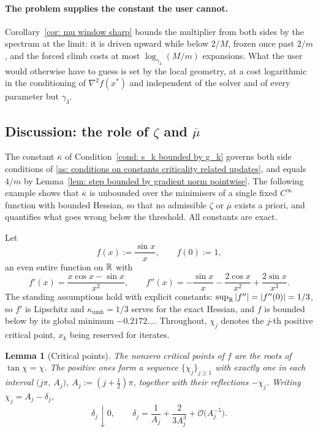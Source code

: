 \documentclass[11pt]{article}
\theoremstyle{plain}
\newtheorem{lemma}[theorem]{Lemma}
\theoremstyle{definition}
\theoremstyle{remark}
\numberwithin{equation}{section}
\providecommand{\defeq}{\mathrel{:=}}
\newcommand*\mykappa[1]{\kappa_{\scriptscriptstyle\text{#1}}}
\providecommand{\gthree}{\gamma_3}
\providecommand{\kbar}{\overline{\kappa}}
\providecommand{\kbar}{\overline{\kappa}}
\providecommand{\calO}{\mathcal{O}}
\begin{document}
\paragraph{The problem supplies the constant the user cannot.}
Corollary~\ref{cor: mu window sharp} bounds the multiplier from both sides by the spectrum at the
limit: it is driven upward while below $2/M$, frozen once past $2/m$, and the forced climb costs
at most $\log_{\gthree}(M/m)$ expansions. What the user would otherwise have to guess is set by
the local geometry, at a cost logarithmic in the conditioning of $\nabla^2 f(x^*)$ and independent
of the solver and of every parameter but $\gthree$.

\subsection{Discussion: the role of \texorpdfstring{$\zeta$}{zeta} and
            \texorpdfstring{$\overline{\mu}$}{mu-bar}}
\label{subsec:discussion on the convergence rate}

The constant $\kbar$ of Condition~\ref{cond: s_k bounded by g_k} governs both side conditions of
\ref{as: conditions on constants criticality related updates}, and equals $4/m$ by
Lemma~\ref{lem: step bounded by gradient norm pointwise}. The following example shows that $\kbar$
is unbounded over the minimisers of a single fixed $C^\infty$ function with bounded Hessian, so
that no admissible $\zeta$ or $\overline{\mu}$ exists a priori, and quantifies what goes wrong
below the threshold. All constants are exact.

Let
\begin{equation}
    f(x) \defeq \frac{\sin x}{x} , \qquad f(0) \defeq 1 ,
    \label{eqn: sinc f}
\end{equation}
an even entire function on ${\mathbb{R}}$ with
\begin{equation}
    f'(x) = \frac{x\cos x - \sin x}{x^2} ,
    \qquad
    f''(x) = -\frac{\sin x}{x} - \frac{2\cos x}{x^2} + \frac{2\sin x}{x^3} .
    \label{eqn: sinc derivs}
\end{equation}
The standing assumptions hold with explicit constants: $\sup_{\mathbb{R}}\left \vert f'' \right \vert = \left \vert f''(0) \right \vert = 1/3$,
so $f'$ is Lipschitz and $\mykappa{umh} = 1/3$ serves for the exact Hessian, and $f$ is bounded
below by its global minimum $-0.2172\ldots$. Throughout, $\chi_j$ denotes the $j$-th positive
critical point, $x_k$ being reserved for iterates.

\begin{lemma}[Critical points]
\label{lem: sinc critpoints}
    The nonzero critical points of $f$ are the roots of $\tan \chi = \chi$. The positive ones form
    a sequence $\{\chi_j\}_{j\geq1}$ with exactly one in each interval
    $\bigl(j\pi,\, A_j\bigr)$, $A_j \defeq (j+\tfrac12)\pi$, together with their reflections
    $-\chi_j$. Writing $\chi_j = A_j - \delta_j$,
    \begin{equation}
        \delta_j \downarrow 0 ,
        \qquad
        \delta_j = \frac{1}{A_j} + \frac{2}{3A_j^{3}} + \calO\bigl(A_j^{-5}\bigr) .
        \label{eqn: sinc roots}
    \end{equation}
\end{lemma}
\end{document}
